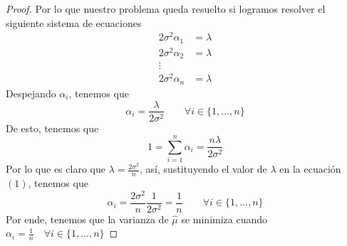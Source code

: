 \documentclass[10pt,a4paper]{article}
\theoremstyle{plain}
\theoremstyle{definition}
\theoremstyle{remark}
\newenvironment{prueba}{\renewcommand{\proofname}{Prueba}\renewcommand{\qedsymbol}{}\begin{proof}}{\end{proof}}
\begin{document}
\begin{enumerate}
\begin{enumerate}
\begin{prueba}
        Por lo que nuestro problema queda resuelto si logramos resolver el siguiente sistema de ecuaciones
        \begin{eqnarray*}
        2\sigma^{2}\alpha_{1} & = \lambda \\
        2\sigma^{2}\alpha_{2} & = \lambda \\
        \vdots & \\
        2\sigma^{2}\alpha_{n} & = \lambda
        \end{eqnarray*}
        Despejando $\alpha_i$, tenemos que
        \begin{equation}
            \alpha_i = \frac{\lambda}{2\sigma^{2}} \qquad \forall i\in\{1,...,n\}
        \end{equation}
        De esto, tenemos que 
        \begin{equation*}
            1 = \sum_{i=1}^{n}\alpha_i = \frac{n\lambda}{2\sigma^2}
        \end{equation*}
        Por lo que es claro que $\lambda = \frac{2\sigma^2}{n}$, así, sustituyendo el valor de $\lambda$ en la ecuación $(1)$, tenemos que
\begin{equation*}
    \alpha_i = \frac{2\sigma^2}{n}\frac{1}{2\sigma^2} = \frac{1}{n} \qquad \forall i \in\{1,...,n\}
\end{equation*}
Por ende, tenemos que la varianza de $\hat{\mu}$ se minimiza cuando $\alpha_i = \frac{1}{n}\quad\forall i \in\{1,...,n\}$
        \end{prueba}
    \end{enumerate}
\end{enumerate}
\end{document}
